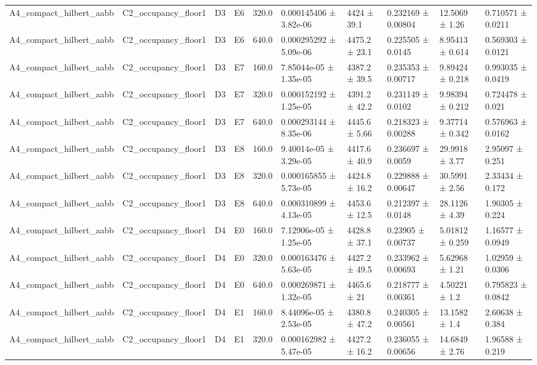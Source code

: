 \begin{table}
\begin{tabular}{llllllllll}
A4\_compact\_hilbert\_aabb & C2\_occupancy\_floor1 & D3 & E6 & 320.0 & 0.000145406 ± 3.82e-06 & 4424 ± 39.1 & 0.232169 ± 0.00804 & 12.5069 ± 1.26 & 0.710571 ± 0.0211 \\
A4\_compact\_hilbert\_aabb & C2\_occupancy\_floor1 & D3 & E6 & 640.0 & 0.000295292 ± 5.09e-06 & 4475.2 ± 23.1 & 0.225505 ± 0.0145 & 8.95413 ± 0.614 & 0.569303 ± 0.0121 \\
A4\_compact\_hilbert\_aabb & C2\_occupancy\_floor1 & D3 & E7 & 160.0 & 7.85044e-05 ± 1.35e-05 & 4387.2 ± 39.5 & 0.235353 ± 0.00717 & 9.89424 ± 0.218 & 0.993035 ± 0.0419 \\
A4\_compact\_hilbert\_aabb & C2\_occupancy\_floor1 & D3 & E7 & 320.0 & 0.000152192 ± 1.25e-05 & 4391.2 ± 42.2 & 0.231149 ± 0.0102 & 9.98394 ± 0.212 & 0.724478 ± 0.021 \\
A4\_compact\_hilbert\_aabb & C2\_occupancy\_floor1 & D3 & E7 & 640.0 & 0.000293144 ± 8.35e-06 & 4445.6 ± 5.66 & 0.218323 ± 0.00288 & 9.37714 ± 0.342 & 0.576963 ± 0.0162 \\
A4\_compact\_hilbert\_aabb & C2\_occupancy\_floor1 & D3 & E8 & 160.0 & 9.40014e-05 ± 3.29e-05 & 4417.6 ± 40.9 & 0.236697 ± 0.0059 & 29.9918 ± 3.77 & 2.95097 ± 0.251 \\
A4\_compact\_hilbert\_aabb & C2\_occupancy\_floor1 & D3 & E8 & 320.0 & 0.000165855 ± 5.73e-05 & 4424.8 ± 16.2 & 0.229888 ± 0.00647 & 30.5991 ± 2.56 & 2.33434 ± 0.172 \\
A4\_compact\_hilbert\_aabb & C2\_occupancy\_floor1 & D3 & E8 & 640.0 & 0.000310899 ± 4.13e-05 & 4453.6 ± 12.5 & 0.212397 ± 0.0148 & 28.1126 ± 4.39 & 1.90305 ± 0.224 \\
A4\_compact\_hilbert\_aabb & C2\_occupancy\_floor1 & D4 & E0 & 160.0 & 7.12906e-05 ± 1.25e-05 & 4428.8 ± 37.1 & 0.23905 ± 0.00737 & 5.01812 ± 0.259 & 1.16577 ± 0.0949 \\
A4\_compact\_hilbert\_aabb & C2\_occupancy\_floor1 & D4 & E0 & 320.0 & 0.000163476 ± 5.63e-05 & 4427.2 ± 49.5 & 0.233962 ± 0.00693 & 5.62968 ± 1.21 & 1.02959 ± 0.0306 \\
A4\_compact\_hilbert\_aabb & C2\_occupancy\_floor1 & D4 & E0 & 640.0 & 0.000269871 ± 1.32e-05 & 4465.6 ± 21 & 0.218777 ± 0.00361 & 4.50221 ± 1.2 & 0.795823 ± 0.0842 \\
A4\_compact\_hilbert\_aabb & C2\_occupancy\_floor1 & D4 & E1 & 160.0 & 8.44096e-05 ± 2.53e-05 & 4380.8 ± 47.2 & 0.240305 ± 0.00561 & 13.1582 ± 1.4 & 2.60638 ± 0.384 \\
A4\_compact\_hilbert\_aabb & C2\_occupancy\_floor1 & D4 & E1 & 320.0 & 0.000162982 ± 5.47e-05 & 4427.2 ± 16.2 & 0.236055 ± 0.00656 & 14.6849 ± 2.76 & 1.96588 ± 0.219 \\

\end{tabular}
\end{table}
